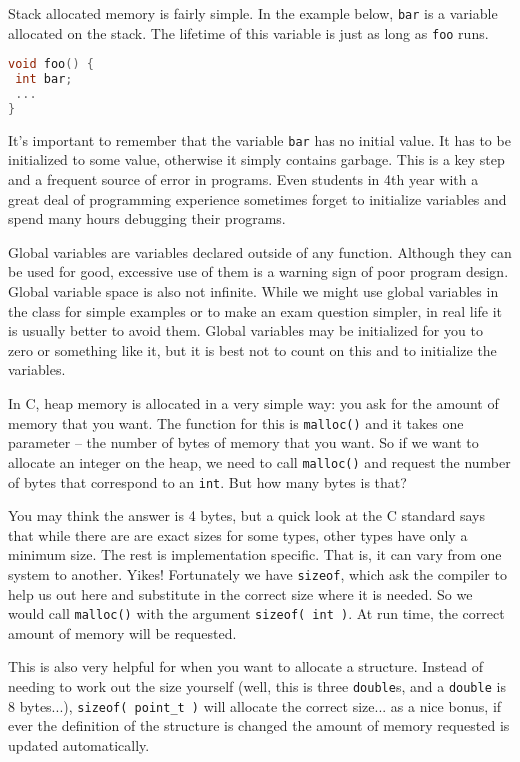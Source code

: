 Stack allocated memory is fairly simple. In the example below, \texttt{bar} is a variable allocated on the stack. The lifetime of this variable is just as long as \texttt{foo} runs.

\begin{lstlisting}[language=C]
void foo() {
 int bar;
 ...
}
\end{lstlisting}

It's important to remember that the variable \texttt{bar} has no initial value. It has to be initialized to some value, otherwise it simply contains garbage. This is a key step and a frequent source of error in programs. Even students in 4th year with a great deal of programming experience sometimes forget to initialize variables and spend many hours debugging their programs.

Global variables are variables declared outside of any function. Although they can be used for good, excessive use of them is a warning sign of poor program design. Global variable space is also not infinite. While we might use global variables in the class for simple examples or to make an exam question simpler, in real life it is usually better to avoid them. Global variables may be initialized for you to zero or something like it, but it is best not to count on this and to initialize the variables.

In C, heap memory is allocated in a very simple way: you ask for the amount of memory that you want. The function for this is \texttt{malloc()} and it takes one parameter -- the number of bytes of memory that you want. So if we want to allocate an integer on the heap, we need to call \texttt{malloc()} and request the number of bytes that correspond to an \texttt{int}. But how many bytes is that?

You may think the answer is 4 bytes, but a quick look at the C standard says that while there are are exact sizes for some types, other types have only a minimum size. The rest is implementation specific. That is, it can vary from one system to another. Yikes! Fortunately we have \texttt{sizeof}, which ask the compiler to help us out here and substitute in the correct size where it is needed. So we would call \texttt{malloc()} with the argument \texttt{sizeof( int )}. At run time, the correct amount of memory will be requested.

This is also very helpful for when you want to allocate a structure. Instead of needing to work out the size yourself (well, this is three \texttt{double}s, and a \texttt{double} is 8 bytes...), \texttt{sizeof( point\_t )} will allocate the correct size... as a nice bonus, if ever the definition of the structure is changed the amount of memory requested is updated automatically.

